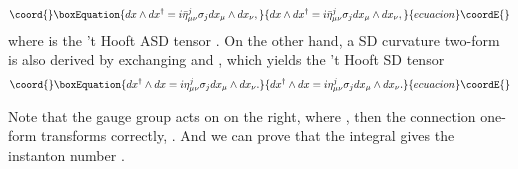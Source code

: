 \documentclass[a4paper,10pt]{article}
\begin{document}
\begin{equation}\coord{}\boxEquation{
dx \wedge dx^{\dagger}=i\bar{\eta}^j_{\mu\nu}\sigma_jdx_\mu 
\wedge dx_\nu,
}{
dx \wedge dx^{\dagger}=i\bar{\eta}^j_{\mu\nu}\sigma_jdx_\mu 
\wedge dx_\nu,
}{ecuacion}\coordE{}\end{equation}
where \coordHE{} is the 't Hooft ASD tensor \cite{'tH}.
On the other hand, a SD curvature two-form is also derived by exchanging \coordHE{} and \coordHE{}, which yields the 't Hooft SD tensor \coordHE{} \cite{'tH}
\begin{equation}\coord{}\boxEquation{
dx^{\dagger} \wedge 
dx=i\eta^j_{\mu\nu}\sigma_jdx_\mu \wedge dx_\nu.
}{
dx^{\dagger} \wedge 
dx=i\eta^j_{\mu\nu}\sigma_jdx_\mu \wedge dx_\nu.
}{ecuacion}\coordE{}\end{equation}


Note that the gauge group acts on \coordHE{} on the right, \coordHE{} where \coordHE{}, then the connection one-form transforms correctly, \coordHE{}.
And we can prove that the integral \coordHE{} gives the instanton number \coordHE{}.
\end{document}
